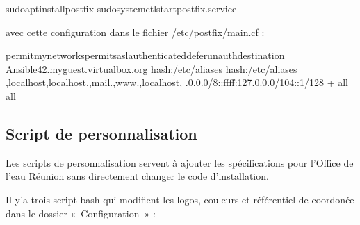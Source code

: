 \documentclass[letterpaper,10pt,french]{sphinxmanual}
\begin{document}
\begin{sphinxVerbatim}[commandchars=\\\{\}]
sudoaptinstallpostfix
sudosystemctlstartpostfix.service
\end{sphinxVerbatim}

\sphinxAtStartPar
avec cette configuration dans le fichier /etc/postfix/main.cf :

\begin{sphinxVerbatim}[commandchars=\\\{\}]
permit\PYGZus{}mynetworkspermit\PYGZus{}sasl\PYGZus{}authenticateddefer\PYGZus{}unauth\PYGZus{}destination
Ansible\PYGZhy{}42.myguest.virtualbox.org
hash:/etc/aliases
hash:/etc/aliases
,localhost,localhost.,mail.,www.,localhost,
.0.0.0/8\PYG{o}{[}::ffff:127.0.0.0\PYG{o}{]}/104\PYG{o}{[}::1\PYG{o}{]}/128
+
all
all
\end{sphinxVerbatim}


\subsection{Script de personnalisation}
\label{\detokenize{doc_instal/installation:script-de-personnalisation}}
\sphinxAtStartPar
Les scripts de personnalisation servent à ajouter les spécifications pour l’Office de l’eau Réunion sans directement changer le code d’installation.

\sphinxAtStartPar
Il y’a trois script bash qui modifient les logos, couleurs et référentiel de coordonée dans le dossier « Configuration » :
\end{document}
